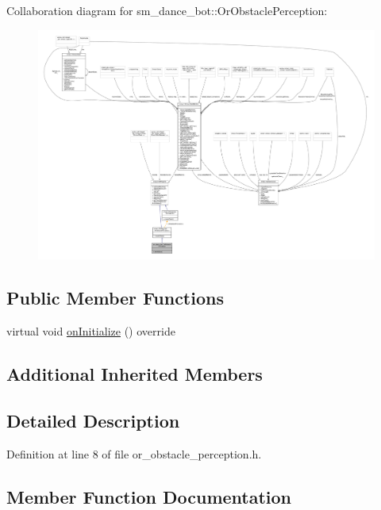 Collaboration diagram for sm\+\_\+dance\+\_\+bot\+:\+:Or\+Obstacle\+Perception\+:\nopagebreak
\begin{figure}[H]
\begin{center}
\leavevmode
\includegraphics[width=350pt]{classsm__dance__bot_1_1OrObstaclePerception__coll__graph}
\end{center}
\end{figure}
\subsection*{Public Member Functions}
\begin{DoxyCompactItemize}
\item 
virtual void \hyperlink{classsm__dance__bot_1_1OrObstaclePerception_a4597fbab143e9bc3e350dfa730242a08}{on\+Initialize} () override
\end{DoxyCompactItemize}
\subsection*{Additional Inherited Members}


\subsection{Detailed Description}


Definition at line 8 of file or\+\_\+obstacle\+\_\+perception.\+h.



\subsection{Member Function Documentation}
